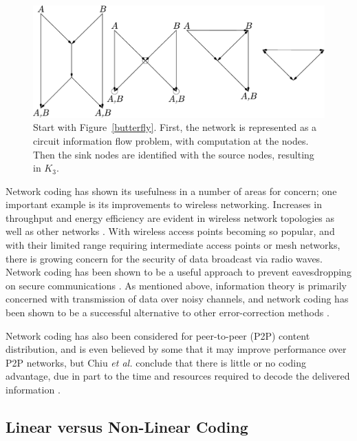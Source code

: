 \begin{figure}[ht]
	\centering
	\includegraphics[width=350pt]{figures/butterfly_to_k3.pdf}
	\caption[Converting the butterfly network to a graph]{Start with Figure~\ref{butterfly}. First, the network is represented as a circuit information flow problem, with computation at the nodes. Then the sink nodes are identified with the source nodes, resulting in $K_3$.}
	\label{butterfly_to_k3}
\end{figure}

Network coding has shown its usefulness in a number of areas for concern; one important example is its improvements to wireless networking. Increases in throughput and energy efficiency are evident in wireless network topologies as well as other networks \cite{sagd2005}. With wireless access points becoming so popular, and with their limited range requiring intermediate access points or mesh networks, there is growing concern for the security of data broadcast via radio waves. Network coding has been shown to be a useful approach to prevent eavesdropping on secure communications \cite{caiy2002}. As mentioned above, information theory is primarily concerned with transmission of data over noisy channels, and network coding has been shown to be a successful alternative to other error-correction methods \cite{lars2006}.

Network coding has also been considered for peer-to-peer (P2P) content distribution, and is even believed by some that it may improve performance over P2P networks, but Chiu \textit{et al.} conclude that there is little or no coding advantage, due in part to the time and resources required to decode the delivered information \cite{chiu2006}.

\subsection{Linear versus Non-Linear Coding}
\label{sect:lin_v_nonlin}

